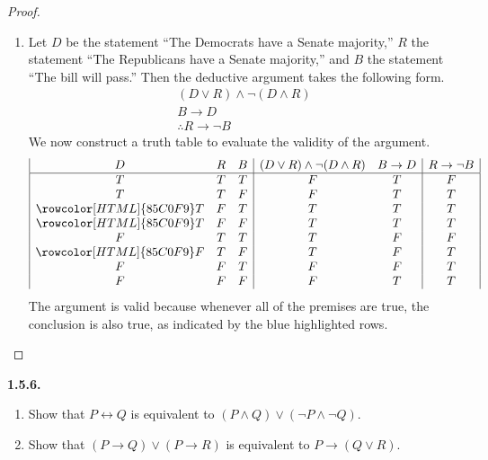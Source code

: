 \documentclass[12pt]{amsart}
\newenvironment{statement}[1]{\smallskip\noindent\color[rgb]{.6627, .3529, .6314} {\bf #1.}}{}
\theoremstyle{definition}
\theoremstyle{remark}
\begin{document}
\begin{proof}
\begin{enumerate}
	\item Let $D$ be the statement ``The Democrats have a Senate majority,'' $R$ the statement ``The Republicans have a Senate majority,'' and $B$ the statement ``The bill will pass.''
	Then the deductive argument takes the following form.
	\begin{equation*}
		\begin{array}{l}
			(D \vee R) \wedge \neg (D \wedge R) \\
			B \rightarrow D \\
			\hline
			\therefore R \rightarrow \neg B
		\end{array}
	\end{equation*}
	We now construct a truth table to evaluate the validity of the argument.
	\begin{equation*}
		\begin{array}{| c c c | c c | c |}
			D & R & B & (D \vee R) \wedge \neg (D \wedge R) & B \rightarrow D & R \rightarrow \neg B \\
			\hline
			T & T & T & F & T & F \\
			T & T & F & F & T & T \\
			\rowcolor[HTML]{85C0F9} T & F & T & T & T & T \\
			\rowcolor[HTML]{85C0F9} T & F & F & T & T & T \\
			F & T & T & T & F & F\\
			\rowcolor[HTML]{85C0F9} F & T & F & T & F & T \\
			F & F & T & F & F & T \\
			F & F & F & F & T & T
		\end{array}
	\end{equation*}
	The argument is valid because whenever all of the premises are true, the conclusion is also true, as indicated by the blue highlighted rows.
\end{enumerate}
\end{proof}


\begin{statement}{1.5.6}
\begin{enumerate}
	\item Show that $P \leftrightarrow Q$ is equivalent to $(P \wedge Q) \vee (\neg P \wedge \neg Q)$.
	
	\item Show that $(P \rightarrow Q) \vee (P \rightarrow R)$ is equivalent to $P \rightarrow (Q \vee R)$.
\end{enumerate}
\end{statement}
\end{document}
